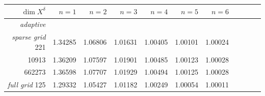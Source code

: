 \documentclass[11pt,a4paper,oneside,english]{amsart}
\numberwithin{equation}{section}
\numberwithin{theorem}{section}
\theoremstyle{definition}
\begin{document}
\begin{table}
  \begin{tabular}{rrrrrrrrrrr}\toprule
    $\dim X^\delta$ & $n=1$ & $n=2$ & $n=3$ & $n=4$ & $n=5$  & $n=6$\\\midrule
    \emph{adaptive} \quad
    \\\midrule
    \emph{sparse grid} \quad
    221    & 1.34285  & 1.06806  & 1.01631  & 1.00405  & 1.00101 & 1.00024 \\
    10913  & 1.36209  & 1.07597  & 1.01901  & 1.00485  & 1.00123 & 1.00028 \\
    662273 & 1.36598  & 1.07707  & 1.01929  & 1.00494  & 1.00125 & 1.00028 \\
    \midrule
    \emph{full grid} \quad
    125     & 1.29332  & 1.05427  & 1.01182  & 1.00249  & 1.00054  & 1.00011 \\

\end{tabular}
\end{table}
\end{document}
